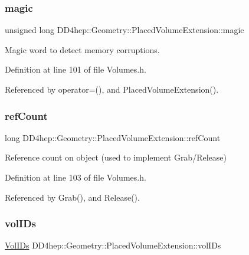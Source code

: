 \subsubsection{\texorpdfstring{magic}{magic}}
{\footnotesize\ttfamily unsigned long D\+D4hep\+::\+Geometry\+::\+Placed\+Volume\+Extension\+::magic}



Magic word to detect memory corruptions. 



Definition at line 101 of file Volumes.\+h.



Referenced by operator=(), and Placed\+Volume\+Extension().

\hypertarget{class_d_d4hep_1_1_geometry_1_1_placed_volume_extension_a4feb981d8c7a9cfdd75e525ee0cfd527}{}\label{class_d_d4hep_1_1_geometry_1_1_placed_volume_extension_a4feb981d8c7a9cfdd75e525ee0cfd527} 
\subsubsection{\texorpdfstring{ref\+Count}{refCount}}
{\footnotesize\ttfamily long D\+D4hep\+::\+Geometry\+::\+Placed\+Volume\+Extension\+::ref\+Count}



Reference count on object (used to implement Grab/\+Release) 



Definition at line 103 of file Volumes.\+h.



Referenced by Grab(), and Release().

\hypertarget{class_d_d4hep_1_1_geometry_1_1_placed_volume_extension_ad5f78671de81a717b16fdefd5483b153}{}\label{class_d_d4hep_1_1_geometry_1_1_placed_volume_extension_ad5f78671de81a717b16fdefd5483b153} 
\subsubsection{\texorpdfstring{vol\+I\+Ds}{volIDs}}
{\footnotesize\ttfamily \hyperlink{class_d_d4hep_1_1_geometry_1_1_placed_volume_extension_1_1_vol_i_ds}{Vol\+I\+Ds} D\+D4hep\+::\+Geometry\+::\+Placed\+Volume\+Extension\+::vol\+I\+Ds}



